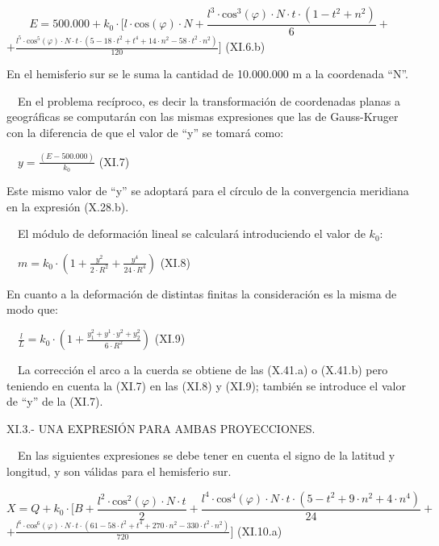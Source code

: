 \documentclass{tufte-book}
\begin{document}
\begin{equation*}
{E=\text{500}\text{.}\text{000}+k_{{0}}\cdot [l\cdot
\text{cos}\left(\varphi \right)\cdot N+\frac{l^{{3}}\cdot
\text{cos}^{{3}}\left(\varphi \right)\cdot N\cdot t\cdot
\left(1-t^{{2}}+n^{{2}}\right)}{6}+}
\end{equation*}
 ${+{\frac{l^{{5}}\cdot \text{cos}^{{5}}\left(\varphi \right)\cdot
N\cdot t\cdot \left(5-\text{18}\cdot t^{{2}}+t^{{4}}+\text{14}\cdot
n^{{2}}-\text{58}\cdot t^{{2}}\cdot n^{{2}}\right)}{\text{120}}}]}$ 
(XI.6.b)

En el hemisferio sur se le suma la cantidad de 10.000.000 m a la
coordenada {\textquotedblleft}N{\textquotedblright}.

\ \ En el problema recíproco, es decir la transformación de
coordenadas planas a geográficas se computarán con las mismas
expresiones que las de Gauss-Kruger con la diferencia de que el valor
de {\textquotedblleft}y{\textquotedblright} se tomará como:

\ \  ${y=\frac{\left(E-\text{500}\text{.}\text{000}\right)}{k_{{0}}}}$ 
(XI.7)

Este mismo valor de {\textquotedblleft}y{\textquotedblright} se
adoptará para el círculo de la convergencia meridiana en la
expresión (X.28.b).

\ \ El módulo de deformación lineal se calculará introduciendo el
valor de  ${k_{{0}}}$:

\ \  ${m=k_{{0}}\cdot \left(1+\frac{y^{{2}}}{2\cdot
R^{{2}}}+\frac{y^{{4}}}{\text{24}\cdot R^{{4}}}\right)}$  (XI.8)

En cuanto a la deformación de distintas finitas la consideración es
la misma de modo que:

\ \  ${\frac{l}{L}=k_{{0}}\cdot \left(1+\frac{y_{{1}}^{{2}}+y^{{1}}\cdot
y^{{2}}+y_{{2}}^{{2}}}{6\cdot R^{{2}}}\right)}$  (XI.9)

\ \ La corrección el arco a la cuerda se obtiene de las (X.41.a) o
(X.41.b) pero teniendo en cuenta la (XI.7) en las (XI.8) y (XI.9);
también se introduce el valor de
{\textquotedblleft}y{\textquotedblright} de la (XI.7).

XI.3.- UNA EXPRESIÓN PARA AMBAS PROYECCIONES.

\ \ En las siguientes expresiones se debe tener en cuenta el signo de la
latitud y longitud, y son válidas para el hemisferio sur.

\begin{equation*}
{X=Q+k_{{0}}\cdot [B+\frac{l^{{2}}\cdot \text{cos}^{{2}}\left(\varphi
\right)\cdot N\cdot t}{2}+\frac{l^{{4}}\cdot
\text{cos}^{{4}}\left(\varphi \right)\cdot N\cdot t\cdot
\left(5-t^{{2}}+9\cdot n^{{2}}+4\cdot n^{{4}}\right)}{\text{24}}+}
\end{equation*}
 ${+{\frac{l^{{6}}\cdot \text{cos}^{{6}}\left(\varphi \right)\cdot
N\cdot t\cdot \left(\text{61}-\text{58}\cdot
t^{{2}}+t^{{4}}+\text{270}\cdot n^{{2}}-\text{330}\cdot t^{{2}}\cdot
n^{{2}}\right)}{\text{720}}}]}$  (XI.10.a)
\end{document}
